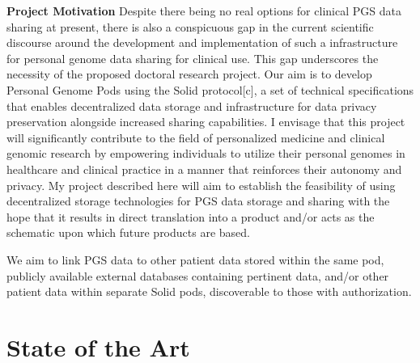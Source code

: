\documentclass[runningheads]{llncs}
\begin{document}
\textbf{Project Motivation}
Despite there being no real options for clinical PGS data sharing at present, there is also a conspicuous gap in the current scientific discourse around the development and implementation of such a infrastructure for personal genome data sharing for clinical use. 
This gap underscores the necessity of the proposed doctoral research project.
Our aim is to develop Personal Genome Pods using the Solid protocol[c], a set of technical specifications that enables decentralized data storage and infrastructure for data privacy preservation alongside increased sharing capabilities.  
I envisage that this project will significantly contribute to the field of personalized medicine and clinical genomic research by empowering individuals to utilize their personal genomes in healthcare and clinical practice in a manner that reinforces their autonomy and privacy. 
My project described here will aim to establish the feasibility of using decentralized storage technologies for PGS data storage and sharing with the hope that it results in direct translation into a product and/or acts as the schematic upon which future products are based. 


We aim to link PGS data to other patient data stored within the same pod, publicly available external databases containing pertinent data, and/or other patient data within separate Solid pods, discoverable to those with authorization.


\section{State of the Art}

\end{document}
